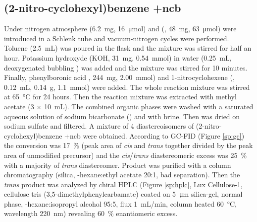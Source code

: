 
\subsection{(2-nitro-cyclo\-hexyl)benzene \cmpd+{ncb}}

Under nitrogen atmosphere  (6.2~mg, \SI{16}{\micro\mole}) and \legante{}%
(, 48~mg, \SI{63}{\micro\mole}) were introduced in a Schlenk tube and vacuum-nitrogen cycles were performed. Toluene (2.5~mL) was poured in the flask and the mixture was stirred for half an hour. Potassium hydroxyde (KOH, 31~mg, 0.54~mmol) in water (0.25~mL, deoxygenated bubbling 
) was added and the mixture was stirred for 10 minutes. Finally, phenyl\-boronic acid , 244~mg, 2.00~mmol) and 1-nitro\-cyclo\-hexene (, 0.12~mL, 0.14~g, 1.1~mmol) were added. 
The whole reaction mixture was stirred at \SI{65}{\celsius} for 24 hours. Then the reaction mixture was extracted with methyl acetate (3 $\times$ 10~mL). The combined organic phases were washed with a saturated aqueous solution of sodium bi\-carbonate () and with brine.%
Then was dried on sodium sulfate and filtered. A mixture of 4 diastereoisomers of (2-nitro-cyclo\-hexyl)benzene \cmpd+{ncb} were obtained. According to GC-FID (Figure \ref{sp:gc}) the conversion was 17~\% (peak area of \emph{cis} and \emph{trans} together divided by the peak area of unmodified precursor) and the \emph{cis}/\emph{trans} diastereo\-meric excess was 25~\% with a majority of \emph{trans} diastereomer. Product was purified with a column chromatography (silica, \n-hexane:ethyl acetate 20:1, bad separation). Then the \emph{trans} product was analyzed by chiral HPLC (Figure \ref{sp:hplc}, Lux\textsuperscript{\textregistered} Cellulose-1, cellulose tris (3,5-dimethyl\-phenyl\-carbamate) coated on \SI{5}{\micro\meter} silica-gel, normal phase, \n-hexane:isopropyl alcohol 95:5, flux 1~mL/min, column heated \SI{60}{\celsius}, wavelength 220~nm) revealing 60~\% enantio\-meric excess. 